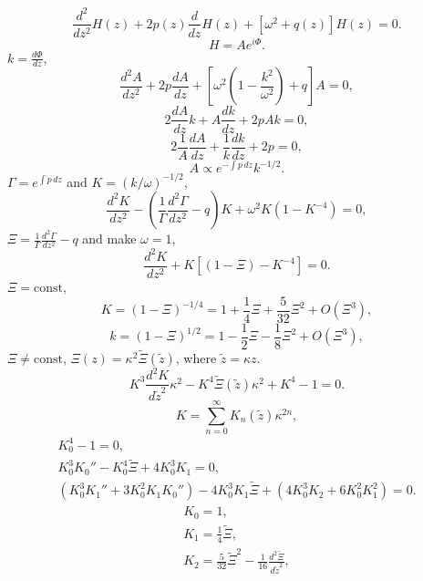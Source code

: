 \begin{equation}
    \frac{d^2}{d z^2}H(z)+2p(z)\frac{d}{d z}H(z)+\left[\omega^2+q(z)\right]H(z)=0.\label{dessoleq}
\end{equation}
\begin{equation}\label{HAphi}
    H=Ae^{i\Phi}.
\end{equation}
$k=\frac{d \Phi}{d z}$,
\begin{equation}\label{rpart}
    \frac{d^2 A}{d z^2}+2p\frac{d A}{d z}+\left[\omega^2\left(1-\frac{k^2}{\omega^2}\right)+q\right]A=0,
\end{equation}
\begin{equation}\label{ipart}
    2\frac{d A}{d z}k+A\frac{d k}{d z}+2pAk=0,
\end{equation}
\begin{equation}
    2\frac{1}{A}\frac{d A}{d z}+\frac{1}{k}\frac{d k}{d z}+2p=0,
\end{equation}
\begin{equation}\label{Apk}
    A\propto e^{-\int p\,dz}k^{-1/2}.
\end{equation}
$\Gamma=e^{\int p \,dz}$ and $K=(k/\omega)^{-1/2}$,
\begin{equation}\label{equK0}
    \frac{d^2 K}{d z^2}-\left(\frac{1}{\Gamma}\frac{d^2\Gamma}{d z^2}-q\right)K+\omega^2K(1-K^{-4})=0,
\end{equation}
$\Xi=\frac{1}{\Gamma}\frac{d^2\Gamma}{d z^2}-q$ and make $\omega=1$,
\begin{equation}\label{equK}
    \frac{d^2 K}{d z^2}+K[(1-\Xi)-K^{-4}]=0.
\end{equation}
$\Xi=\text{const}$,
\begin{equation}\label{K0}
    K=(1-\Xi)^{-1/4}=1+\frac{1}{4}\Xi+\frac{5}{32}\Xi^2+O(\Xi^3),
\end{equation}
\begin{equation}
    k=(1-\Xi)^{1/2}=1-\frac{1}{2}\Xi-\frac{1}{8}\Xi^2+O(\Xi^3),
\end{equation}
$\Xi\neq\text{const}$, $\Xi(z)=\kappa^2\tilde{\Xi}(\tilde{z})$, where $\tilde{z}=\kappa z$.
\begin{equation}\label{equKs}
    K^3\frac{d^2 K}{d \tilde{z}^2}\kappa^2-K^4\tilde{\Xi}(\tilde{z})\kappa^2+K^4-1=0.
\end{equation}
\begin{equation}\label{K}
    K=\sum_{n=0}^\infty K_n(\tilde{z})\kappa^{2n},
\end{equation}
\begin{gather}
    K_0^4-1=0,\\
    K_0^3K_0''-K_0^4\tilde{\Xi}+4K_0^3K_1=0,\\
    (K_0^3K_1''+3K_0^2K_1K_0'')-4K_0^3K_1\tilde{\Xi}+(4K_0^3K_2+6K_0^2K_1^2)=0.
\end{gather}
\begin{gather}
    K_0=1,\\
    K_1=\frac{1}{4}\tilde{\Xi},\\
    K_2=\frac{5}{32}\tilde{\Xi}^2-\frac{1}{16}\frac{d^2\tilde{\Xi}}{d\tilde{z}^2},
\end{gather}

